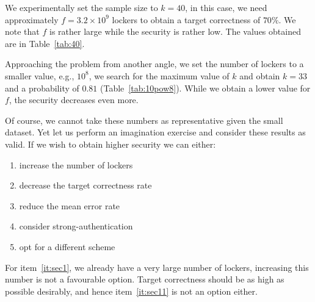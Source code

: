 We experimentally set the sample size to $k=40$, in this case, we need approximately $f=3.2\times10^{9}$ lockers to obtain a target correctness of $70\%$. We note that $f$ is rather large while the security is rather low. The values obtained are in Table~\ref{tab:40}.

Approaching the problem from another angle, we set the number of lockers to a smaller value, e.g., $10^8$, we search for the maximum value of $k$ and obtain $k=33$ and a probability of $0.81$ (Table~\ref{tab:10pow8}). While we obtain a lower value for $f$, the security decreases even more.

Of course, we cannot take these numbers as representative given the small dataset. Yet let us perform an imagination exercise and consider these results as valid. If we wish to obtain higher security we can either:
\begin{enumerate}[label=(\alph*)]
    \item increase the number of lockers\label{it:sec1}
    \item decrease the target correctness rate\label{it:sec11}
    \item reduce the mean error rate\label{it:sec2}
    \item consider strong-authentication \label{it:sec22}
    \item opt for a different scheme\label{it:sec3}
\end{enumerate}
For item~\ref{it:sec1}, we already have a very large number of lockers, increasing this number is not a favourable option. Target correctness should be as high as possible desirably, and hence item~\ref{it:sec11} is not an option either.

